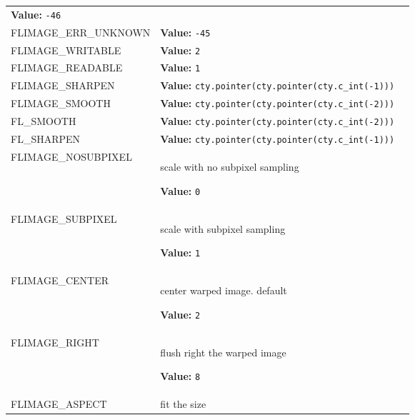 \begin{longtable}{|p{\varnamewidth}|p{\vardescrwidth}|l}
\textbf{Value:} 
{\tt -46}&\\
\cline{1-2}
\raggedright F\-L\-I\-M\-A\-G\-E\-\_\-E\-R\-R\-\_\-U\-N\-K\-N\-O\-W\-N\- & \raggedright \textbf{Value:} 
{\tt -45}&\\
\cline{1-2}
\raggedright F\-L\-I\-M\-A\-G\-E\-\_\-W\-R\-I\-T\-A\-B\-L\-E\- & \raggedright \textbf{Value:} 
{\tt 2}&\\
\cline{1-2}
\raggedright F\-L\-I\-M\-A\-G\-E\-\_\-R\-E\-A\-D\-A\-B\-L\-E\- & \raggedright \textbf{Value:} 
{\tt 1}&\\
\cline{1-2}
\raggedright F\-L\-I\-M\-A\-G\-E\-\_\-S\-H\-A\-R\-P\-E\-N\- & \raggedright \textbf{Value:} 
{\tt cty.pointer(cty.pointer(cty.c\_int(-1)))}&\\
\cline{1-2}
\raggedright F\-L\-I\-M\-A\-G\-E\-\_\-S\-M\-O\-O\-T\-H\- & \raggedright \textbf{Value:} 
{\tt cty.pointer(cty.pointer(cty.c\_int(-2)))}&\\
\cline{1-2}
\raggedright F\-L\-\_\-S\-M\-O\-O\-T\-H\- & \raggedright \textbf{Value:} 
{\tt cty.pointer(cty.pointer(cty.c\_int(-2)))}&\\
\cline{1-2}
\raggedright F\-L\-\_\-S\-H\-A\-R\-P\-E\-N\- & \raggedright \textbf{Value:} 
{\tt cty.pointer(cty.pointer(cty.c\_int(-1)))}&\\
\cline{1-2}
\raggedright F\-L\-I\-M\-A\-G\-E\-\_\-N\-O\-S\-U\-B\-P\-I\-X\-E\-L\- & \raggedright scale with no subpixel sampling

\textbf{Value:} 
{\tt 0}&\\
\cline{1-2}
\raggedright F\-L\-I\-M\-A\-G\-E\-\_\-S\-U\-B\-P\-I\-X\-E\-L\- & \raggedright scale with subpixel sampling

\textbf{Value:} 
{\tt 1}&\\
\cline{1-2}
\raggedright F\-L\-I\-M\-A\-G\-E\-\_\-C\-E\-N\-T\-E\-R\- & \raggedright center warped image. default

\textbf{Value:} 
{\tt 2}&\\
\cline{1-2}
\raggedright F\-L\-I\-M\-A\-G\-E\-\_\-R\-I\-G\-H\-T\- & \raggedright flush right the warped image

\textbf{Value:} 
{\tt 8}&\\
\cline{1-2}
\raggedright F\-L\-I\-M\-A\-G\-E\-\_\-A\-S\-P\-E\-C\-T\- & \raggedright fit the size


\end{longtable}
